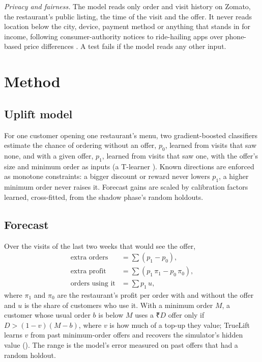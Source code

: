\documentclass[conference]{IEEEtran}
\begin{document}
\emph{Privacy and fairness.} The model reads only order and visit history on Zomato, the restaurant's
public listing, the time of the visit and the offer. It never reads location below the city, device,
payment method or anything that stands in for income, following consumer-authority notices to
ride-hailing apps over phone-based price differences \cite{ccpa}. A test fails if the model reads any
other input.

\section{Method}
\label{sec:method}

\subsection{Uplift model}
For one customer opening one restaurant's menu, two gradient-boosted classifiers \cite{sklearn}
estimate the chance of ordering without an offer, $p_0$, learned from visits that saw none, and with a
given offer, $p_1$, learned from visits that saw one, with the offer's size and minimum order as inputs
(a T-learner \cite{kunzel}). Known directions are enforced as monotone constraints: a bigger discount or
reward never lowers $p_1$, a higher minimum order never raises it. Forecast gains are scaled by
calibration factors learned, cross-fitted, from the shadow phase's random holdouts.

\subsection{Forecast}
Over the visits of the last two weeks that would see the offer,
\begin{align}
\text{extra orders} &= \textstyle\sum (p_1-p_0),\\
\text{extra profit} &= \textstyle\sum (p_1\,\pi_1-p_0\,\pi_0),\\
\text{orders using it} &= \textstyle\sum p_1\,u,
\end{align}
where $\pi_1$ and $\pi_0$ are the restaurant's profit per order with and without the offer and $u$ is
the share of customers who use it. With a minimum order $M$, a customer whose usual order $b$ is below
$M$ uses a ₹$D$ offer only if $D>(1-v)(M-b)$, where $v$ is how much of a top-up they value; TrueLift
learns $v$ from past minimum-order offers and recovers the simulator's hidden value ().
The range is the model's error measured on past offers that had a random holdout.
\end{document}
